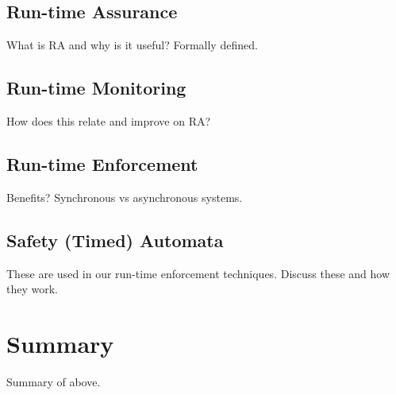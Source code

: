 \subsection{Run-time Assurance}
What is RA and why is it useful? Formally defined.

\subsection{Run-time Monitoring}
How does this relate and improve on RA?

\subsection{Run-time Enforcement}
Benefits? Synchronous vs asynchronous systems. 

\subsection{Safety (Timed) Automata}
These are used in our run-time enforcement techniques. Discuss these and how they work.





\section{Summary}
Summary of above.